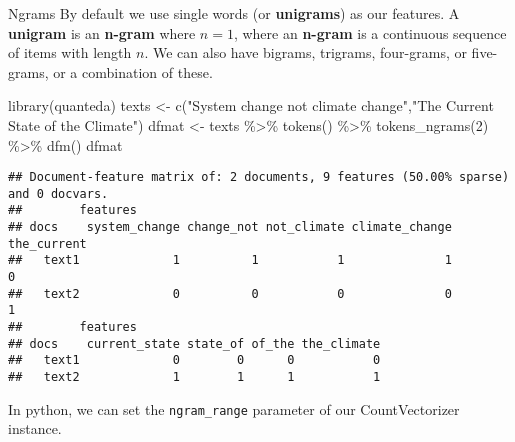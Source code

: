\documentclass[
  10pt,
  ignorenonframetext,
  aspectratio=169]{beamer}
\newenvironment{Shaded}{\begin{snugshade}}{\end{snugshade}}
\newcommand{\DecValTok}[1]{\textcolor[rgb]{0.86,0.86,0.80}{#1}}
\newcommand{\FunctionTok}[1]{\textcolor[rgb]{0.94,0.94,0.56}{#1}}
\newcommand{\NormalTok}[1]{\textcolor[rgb]{0.80,0.80,0.80}{#1}}
\newcommand{\OtherTok}[1]{\textcolor[rgb]{0.94,0.94,0.56}{#1}}
\newcommand{\SpecialCharTok}[1]{\textcolor[rgb]{0.86,0.64,0.64}{#1}}
\newcommand{\StringTok}[1]{\textcolor[rgb]{0.80,0.58,0.58}{#1}}
\begin{document}
\begin{frame}[fragile]{Ngrams}
\protect\hypertarget{ngrams}{}
By default we use single words (or \textbf{unigrams}) as our features. A
\textbf{unigram} is an \textbf{n-gram} where \(n=1\), where an
\textbf{n-gram} is a continuous sequence of items with length \(n\). We
can also have bigrams, trigrams, four-grams, or five-grams, or a
combination of these.

\smallskip

\scriptsize

\begin{Shaded}
\begin{Highlighting}[]
\FunctionTok{library}\NormalTok{(quanteda)}
\NormalTok{texts }\OtherTok{\textless{}{-}} \FunctionTok{c}\NormalTok{(}\StringTok{"System change not climate change"}\NormalTok{,}\StringTok{"The Current State of the Climate"}\NormalTok{)}
\NormalTok{dfmat }\OtherTok{\textless{}{-}}\NormalTok{ texts }\SpecialCharTok{\%\textgreater{}\%}
  \FunctionTok{tokens}\NormalTok{() }\SpecialCharTok{\%\textgreater{}\%}
  \FunctionTok{tokens\_ngrams}\NormalTok{(}\DecValTok{2}\NormalTok{) }\SpecialCharTok{\%\textgreater{}\%} 
  \FunctionTok{dfm}\NormalTok{()}
\NormalTok{dfmat}
\end{Highlighting}
\end{Shaded}

\begin{verbatim}
## Document-feature matrix of: 2 documents, 9 features (50.00% sparse) and 0 docvars.
##        features
## docs    system_change change_not not_climate climate_change the_current
##   text1             1          1           1              1           0
##   text2             0          0           0              0           1
##        features
## docs    current_state state_of of_the the_climate
##   text1             0        0      0           0
##   text2             1        1      1           1
\end{verbatim}

\normalsize

In python, we can set the \texttt{ngram\_range} parameter of our
CountVectorizer instance.
\end{frame}
\end{document}
